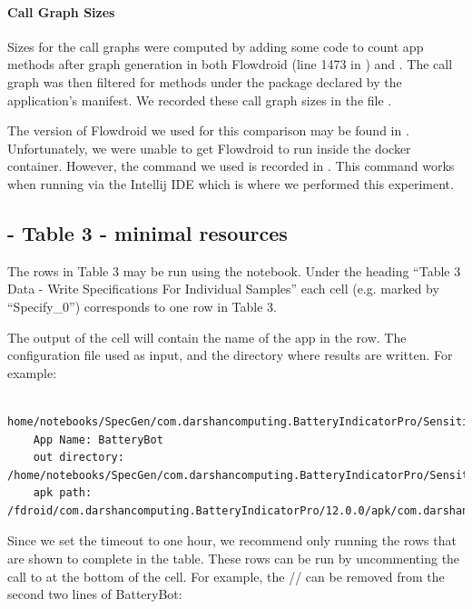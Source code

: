 \documentclass{acmart} %
\begin{document}
\paragraph{Call Graph Sizes} Sizes for the call graphs were computed by adding some code to count app methods after graph generation in both Flowdroid (line 1473 in ) and \toolname.  The call graph was then filtered for methods under the package declared by the application's manifest.  We recorded these call graph sizes in the file .

The version of Flowdroid we used for this comparison may be found in .  Unfortunately, we were unable to get Flowdroid to run inside the docker container. However, the command we used is recorded in .  This command works when running via the Intellij IDE which is where we performed this experiment.

\subsection{ - Table 3 - minimal resources}

The rows in Table 3 may be run using the  notebook.
Under the heading ``Table 3 Data - Write Specifications For Individual Samples'' each cell (e.g. marked by ``Specify\_0'') corresponds to one row in Table 3.

The output of the cell will contain the name of the app in the row. The configuration file used as input, and the directory where results are written.  For example:

\begin{lstlisting}
    home/notebooks/SpecGen/com.darshancomputing.BatteryIndicatorPro/SensitiveDerefCallinCaused/0/config.json
    App Name: BatteryBot
    out directory: /home/notebooks/SpecGen/com.darshancomputing.BatteryIndicatorPro/SensitiveDerefCallinCaused/0
    apk path: /fdroid/com.darshancomputing.BatteryIndicatorPro/12.0.0/apk/com.darshancomputing.BatteryIndicatorPro\_26016.apk
\end{lstlisting}

Since we set the timeout to one hour, we recommend only running the rows that are shown to complete in the table.  These rows can be run by uncommenting the call to  at the bottom of the cell.  For example, the // can be removed from the second two lines of BatteryBot:
\end{document}

